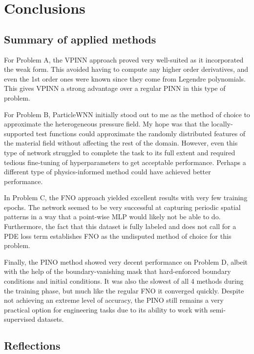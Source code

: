 \chapter{Conclusions}
\label{ch:con}
%


\section{Summary of applied methods}

For Problem A, the VPINN approach proved very well-suited as it incorporated the weak form. This avoided having to compute any higher order derivatives, and even the 1st order ones were known since they come from Legendre polynomials. This gives VPINN a strong advantage over a regular PINN in this type of problem.

For Problem B, ParticleWNN initially stood out to me as the method of choice to approximate the heterogeneous pressure field. My hope was that the locally-supported test functions could approximate the randomly distributed features of the material field without affecting the rest of the domain. However, even this type of network struggled to complete the task to its full extent and required tedious fine-tuning of hyperparameters to get acceptable performance. Perhaps a different type of physics-informed method could have achieved better performance.

In Problem C, the FNO approach yielded excellent results with very few training epochs. The network seemed to be very successful at capturing periodic spatial patterns in a way that a point-wise MLP would likely not be able to do. Furthermore, the fact that this dataset is fully labeled and does not call for a PDE loss term establishes FNO as the undisputed method of choice for this problem.

Finally, the PINO method showed very decent performance on Problem D, albeit with the help of the boundary-vanishing mask that hard-enforced boundary conditions and initial conditions. It was also the slowest of all 4 methods during the training phase, but much like the regular FNO it converged quickly. Despite not achieving an extreme level of accuracy, the PINO still remains a very practical option for engineering tasks due to its ability to work with semi-supervised datasets.

\section{Reflections}

